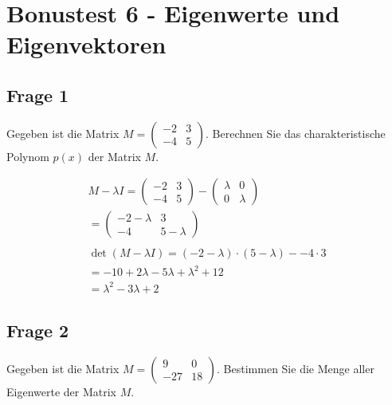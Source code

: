 \chapter{Bonustest 6 - Eigenwerte und Eigenvektoren}

\section{Frage 1}

Gegeben ist die Matrix $M = \begin{pmatrix}
        -2 & 3 \\ -4 & 5
    \end{pmatrix}$. Berechnen Sie das charakteristische Polynom $p(x)$ der Matrix $M$.

\begin{align*}
    M - \lambda I = \begin{pmatrix}
                        -2 & 3 \\
                        -4 & 5
                    \end{pmatrix} - \begin{pmatrix}
                                        \lambda & 0       \\
                                        0       & \lambda
                                    \end{pmatrix}                                \\
    = \begin{pmatrix}
          -2 - \lambda & 3           \\
          -4           & 5 - \lambda
      \end{pmatrix}                                                     \\\\
    \det\left(M - \lambda I\right) = (-2 - \lambda) \cdot (5 - \lambda) - -4 \cdot 3 \\
    = -10 + 2\lambda - 5\lambda + \lambda^2 + 12                                     \\
    = \lambda^2 - 3\lambda + 2
\end{align*}

\section{Frage 2}

Gegeben ist die Matrix $M = \begin{pmatrix}
        9 & 0 \\ -27 & 18
    \end{pmatrix}$. Bestimmen Sie die Menge aller Eigenwerte der Matrix $M$.

